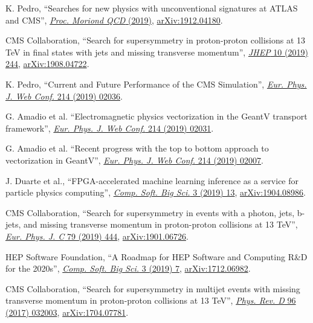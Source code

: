\begin{nbdescription}[leftmargin=12pt,font=\normalfont,labelsep=0em]
\item K. Pedro, ``Searches for new physics with unconventional signatures at ATLAS and CMS'', \href{http://moriond.in2p3.fr/previous-sessions.html}{\emph{Proc. Moriond QCD} (2019)}, \href{https://arxiv.org/abs/1912.04180}{arXiv:1912.04180}. %
\item CMS Collaboration, ``Search for supersymmetry in proton-proton collisions at 13 TeV in final states with jets and missing transverse momentum'', \href{http://dx.doi.org/10.1007/JHEP10(2019)244}{\emph{JHEP} 10 (2019) 244}, \href{https://arxiv.org/abs/1908.04722}{arXiv:1908.04722}. %
\item K. Pedro, ``Current and Future Performance of the CMS Simulation'', \href{https://doi.org/10.1051/epjconf/201921402036}{\emph{Eur. Phys. J. Web Conf.} 214 (2019) 02036}. %
\item G. Amadio et al. ``Electromagnetic physics vectorization in the GeantV transport framework'', \href{https://doi.org/10.1051/epjconf/201921402031}{\emph{Eur. Phys. J. Web Conf.} 214 (2019) 02031}. %
\item G. Amadio et al. ``Recent progress with the top to bottom approach to vectorization in GeantV'', \href{https://doi.org/10.1051/epjconf/201921402007}{\emph{Eur. Phys. J. Web Conf.} 214 (2019) 02007}. %
\item \begin{sloppypar}J. Duarte et al., ``FPGA-accelerated machine learning inference as a service for particle physics computing'', \href{https://doi.org/10.1007/s41781-019-0027-2}{\emph{Comp. Soft. Big Sci.} 3 (2019) 13}, \href{https://arxiv.org/abs/1904.08986}{arXiv:1904.08986}.\end{sloppypar} %
\item CMS Collaboration, ``Search for supersymmetry in events with a photon, jets, b-jets, and missing transverse momentum in proton-proton collisions at 13 TeV'', \href{http://dx.doi.org/10.1140/epjc/s10052-019-6926-x}{\emph{Eur. Phys. J. C} 79 (2019) 444}, \href{https://arxiv.org/abs/1901.06726}{arXiv:1901.06726}. %
\item HEP Software Foundation, ``A Roadmap for HEP Software and Computing R\&D for the 2020s'', \href{https://doi.org/10.1007/s41781-018-0018-8}{\emph{Comp. Soft. Big Sci.} 3 (2019) 7}, \href{https://arxiv.org/abs/1712.06982}{arXiv:1712.06982}. %
\item CMS Collaboration, ``Search for supersymmetry in multijet events with missing transverse momentum in proton-proton collisions at 13 TeV'', \href{http://dx.doi.org/10.1103/PhysRevD.96.032003}{\emph{Phys. Rev. D} 96 (2017) 032003}, \href{http://arxiv.org/abs/1704.07781}{arXiv:1704.07781}. %

\end{nbdescription}
